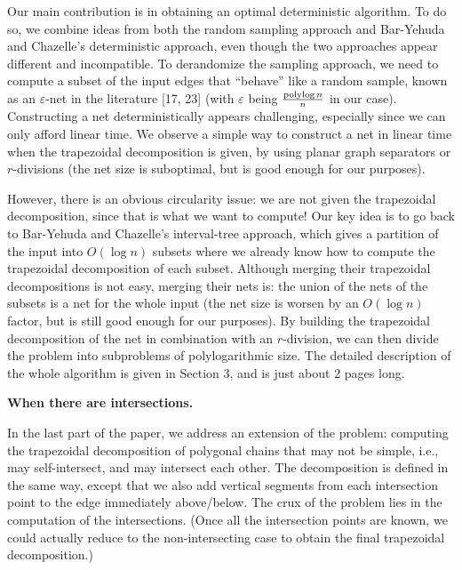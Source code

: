 \par
Our main contribution is in obtaining an optimal deterministic algorithm. To do so, we combine ideas from both the random sampling approach and Bar-Yehuda and Chazelle’s deterministic approach, even though the two approaches appear different and incompatible. To derandomize the sampling approach, we need to compute a subset of the input edges that “behave” like a random sample, known as an $\varepsilon$-net in the literature [17, 23] (with $\varepsilon$ being $\frac{\mathop{\rm polylog}n}{n}$ in our case). Constructing a net deterministically appears challenging, especially since we can only afford linear time. We observe a simple way to construct a net in linear time when the trapezoidal decomposition is given, by using planar graph separators or $r$-divisions (the net size is suboptimal, but is good enough for our purposes).
\par
\par
However, there is an obvious circularity issue: we are not given the trapezoidal decomposition, since that is what we want to compute! Our key idea is to go back to Bar-Yehuda and Chazelle’s interval-tree approach, which gives a partition of the input into $O(\log n)$ subsets where we already know how to compute the trapezoidal decomposition of each subset. Although merging their trapezoidal decompositions is not easy, merging their nets is: the union of the nets of the subsets is a net for the whole input (the net size is worsen by an $O(\log n)$ factor, but is still good enough for our purposes). By building the trapezoidal decomposition of the net in combination with an $r$-division, we can then divide the problem into subproblems of polylogarithmic size. The detailed description of the whole algorithm is given in Section 3, and is just about 2 pages long.
\par
\par
\par\medskip\noindent\textbf{When there are intersections.}\par
In the last part of the paper, we address an extension of the problem: computing the trapezoidal decomposition of polygonal chains that may not be simple, i.e., may self-intersect, and may intersect each other. The decomposition is defined in the same way, except that we also add vertical segments from each intersection point to the edge immediately above/below. The crux of the problem lies in the computation of the intersections. (Once all the intersection points are known, we could actually reduce to the non-intersecting case to obtain the final trapezoidal decomposition.)
